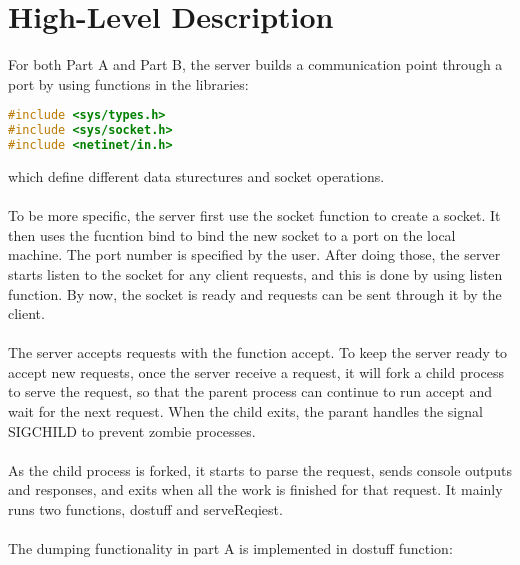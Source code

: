 \documentclass[a4paper, 11pt]{report}
\begin{document}

\section*{High-Level Description}
For both Part A and Part B, the server builds a communication point through a port by using functions in the libraries:

\begin{lstlisting}[language=C]
#include <sys/types.h>
#include <sys/socket.h>
#include <netinet/in.h>
\end{lstlisting}

\noindent which define different data sturectures and socket operations.\\\\
To be more specific, the server first use the {\selectfont socket} function to create a socket. It then uses the fucntion {\selectfont bind} to bind the new socket to a port on the local machine. The port number is specified by the user.
After doing those, the server starts listen to the socket for any client requests, and this is done by using {\selectfont listen} function. By now, the socket is ready and requests can be sent through it by the client.\\\\

The server accepts requests with the function {\selectfont accept}. To keep the server ready to accept new requests, once the server receive a request, it will fork a child process to serve the request, so that the parent process can continue to run {\selectfont accept} and wait for the next request. When the child exits, the parant handles the signal {\selectfont SIGCHILD} to prevent zombie processes.\\\\

As the child process is forked, it starts to parse the request, sends console outputs and responses, and exits when all the work is finished for that request. It mainly runs two functions, {\selectfont dostuff} and {\selectfont serveReqiest}.\\\\

\noindent The dumping functionality in part A is implemented in {\selectfont dostuff} function:
\end{document}
